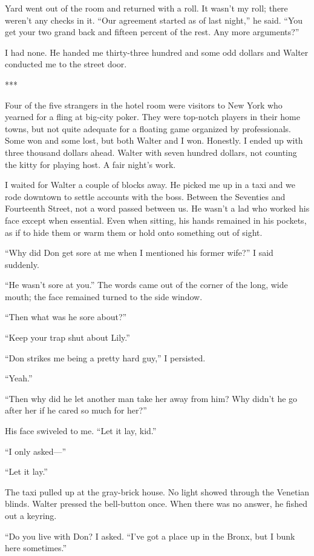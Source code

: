 {Yard went out of the room and returned with a roll. It wasn’t my roll; there weren’t any checks in it. “Our agreement started as of last night,” he said. “You get your two grand back and fifteen percent of the rest. Any more arguments?”

I had none. He handed me thirty-three hundred and some odd dollars and Walter conducted me to the street door.

***

Four of the five strangers in the hotel room were visitors to New York who yearned for a fling at big-city poker. They were top-notch players in their home towns, but not quite adequate for a floating game organized by professionals. Some won and some lost, but both Walter and I won. Honestly. I ended up with three thousand dollars ahead. Walter with seven hundred dollars, not counting the kitty for playing host. A fair night’s work.

I waited for Walter a couple of blocks away. He picked me up in a taxi and we rode downtown to settle accounts with the boss. Between the Seventies and Fourteenth Street, not a word passed between us. He wasn’t a lad who worked his face except when essential. Even when sitting, his hands remained in his pockets, as if to hide them or warm them or hold onto something out of sight.

“Why did Don get sore at me when I mentioned his former wife?” I said suddenly.

“He wasn’t sore at you.” The words came out of the corner of the long, wide mouth; the face remained turned to the side window.

“Then what was he sore about?”

“Keep your trap shut about Lily.”

“Don strikes me being a pretty hard guy,” I persisted.

“Yeah.”

“Then why did he let another man take her away from him? Why didn’t he go after her if he cared so much for her?”

His face swiveled to me. “Let it lay, kid.”

“I only asked—”

“Let it lay.”

The taxi pulled up at the gray-brick house. No light showed through the Venetian blinds. Walter pressed the bell-button once. When there was no answer, he fished out a keyring.

“Do you live with Don? I asked. “I’ve got a place up in the Bronx, but I bunk here sometimes.”

}
